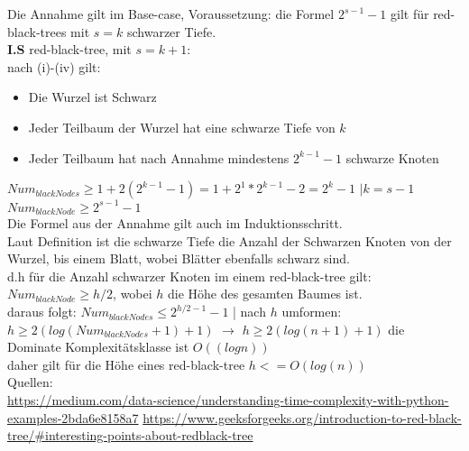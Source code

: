 Die Annahme gilt im Base-case, Voraussetzung: die Formel $2^{s-1}-1$ gilt für red-black-trees mit $s=k$ schwarzer Tiefe.\\

\textbf{I.S} red-black-tree, mit $s=k+1:$\\
nach (i)-(iv) gilt:
\begin{itemize}
	\item Die Wurzel ist Schwarz
	\item Jeder Teilbaum der Wurzel hat eine schwarze Tiefe von $k$
	\item Jeder Teilbaum hat nach Annahme mindestens $2^{k-1}-1$ schwarze Knoten
\end{itemize}
$Num_{blackNodes} \geq 1+2(2^{k-1}-1)=1+2^{1} * 2^{k-1} -2 = 2^k -1$ $| k = s-1$\\
$Num_{blackNode} \geq 2^{s-1}-1$\\

Die Formel aus der Annahme gilt auch im Induktionsschritt. \\

Laut Definition ist die schwarze Tiefe die Anzahl der Schwarzen Knoten von der Wurzel, bis einem Blatt, wobei Blätter ebenfalls schwarz sind.\\
d.h für die Anzahl schwarzer Knoten im einem red-black-tree gilt: $Num_{blackNode} \geq h/2$, wobei $h$ die Höhe des gesamten Baumes ist.\\
daraus folgt: $Num_{blackNodes} \leq 2^{h/2 -1}-1$ | nach $h$ umformen:\\
$h \geq 2(log(Num_{blackNodes} +1)+1)$ $\rightarrow$ $h \geq 2(log(n +1)+1)$ die Dominate Komplexitätsklasse ist $O((log n))$ \\
daher gilt für die Höhe eines red-black-tree $h<= O(log(n))$\\

\noindent
Quellen:\\
\url{https://medium.com/data-science/understanding-time-complexity-with-python-examples-2bda6e8158a7}
\url{https://www.geeksforgeeks.org/introduction-to-red-black-tree/#interesting-points-about-redblack-tree}





















